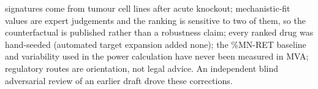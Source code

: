 \begin{description}[leftmargin=0pt,style=nextline,itemsep=4pt,font=\sffamily\bfseries\small\color{branddark}]
signatures come from tumour cell lines after acute knockout; mechanistic-fit values are expert judgements and the ranking is sensitive to two of them, so the counterfactual is published rather than a robustness claim; every ranked drug was hand-seeded (automated target expansion added none); the \%MN-RET baseline and variability used in the power calculation have never been measured in MVA; regulatory routes are orientation, not legal advice. An independent blind adversarial review of an earlier draft drove these corrections.
\end{description}

